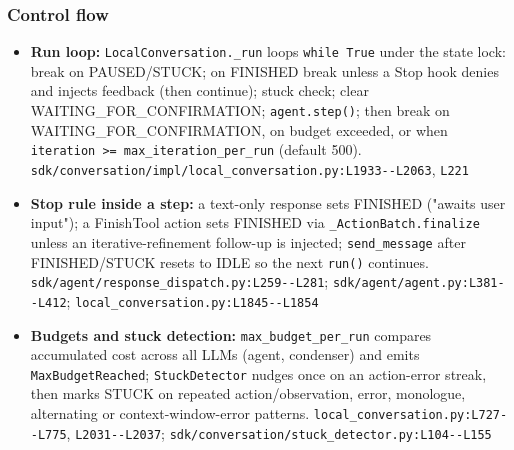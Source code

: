 \subsubsection*{Control flow}
\begin{itemize}
\item \textbf{Run loop:} \texttt{LocalConversation.\allowbreak{}\_\allowbreak{}run} loops \texttt{while True} under the state lock: break on PAUSED/STUCK; on FINISHED break unless a Stop hook denies and injects feedback (then continue); stuck check; clear WAITING\_FOR\_CONFIRMATION; \texttt{agent.\allowbreak{}step(\allowbreak{})}; then break on WAITING\_FOR\_CONFIRMATION, on budget exceeded, or when \texttt{iteration >= max\_\allowbreak{}iteration\_\allowbreak{}per\_\allowbreak{}run} (default 500). \texttt{sdk/\allowbreak{}conversation/\allowbreak{}impl/\allowbreak{}local\_\allowbreak{}conversation.\allowbreak{}py:\allowbreak{}L1933-\allowbreak{}-\allowbreak{}L2063}, \texttt{L221}
\item \textbf{Stop rule inside a step:} a text-only response sets FINISHED ("awaits user input"); a FinishTool action sets FINISHED via \texttt{\_\allowbreak{}ActionBatch.\allowbreak{}finalize} unless an iterative-refinement follow-up is injected; \texttt{send\_\allowbreak{}message} after FINISHED/STUCK resets to IDLE so the next \texttt{run(\allowbreak{})} continues. \texttt{sdk/\allowbreak{}agent/\allowbreak{}response\_\allowbreak{}dispatch.\allowbreak{}py:\allowbreak{}L259-\allowbreak{}-\allowbreak{}L281}; \texttt{sdk/\allowbreak{}agent/\allowbreak{}agent.\allowbreak{}py:\allowbreak{}L381-\allowbreak{}-\allowbreak{}L412}; \texttt{local\_\allowbreak{}conversation.\allowbreak{}py:\allowbreak{}L1845-\allowbreak{}-\allowbreak{}L1854}
\item \textbf{Budgets and stuck detection:} \texttt{max\_\allowbreak{}budget\_\allowbreak{}per\_\allowbreak{}run} compares accumulated cost across all LLMs (agent, condenser) and emits \texttt{MaxBudgetReached}; \texttt{StuckDetector} nudges once on an action-error streak, then marks STUCK on repeated action/observation, error, monologue, alternating or context-window-error patterns. \texttt{local\_\allowbreak{}conversation.\allowbreak{}py:\allowbreak{}L727-\allowbreak{}-\allowbreak{}L775}, \texttt{L2031-\allowbreak{}-\allowbreak{}L2037}; \texttt{sdk/\allowbreak{}conversation/\allowbreak{}stuck\_\allowbreak{}detector.\allowbreak{}py:\allowbreak{}L104-\allowbreak{}-\allowbreak{}L155}

\end{itemize}
